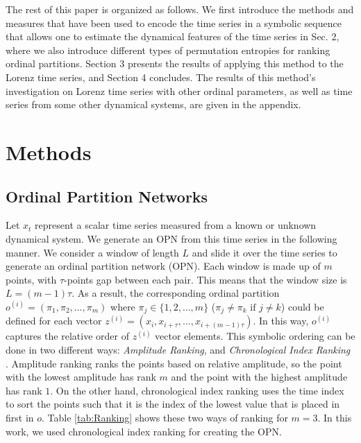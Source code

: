 \documentclass[%
 aip,
 amsmath,amssymb,
 reprint,%
]{revtex4-1}
\begin{document}
The rest of this paper is organized as follows. We first introduce the methods and measures that have been used to encode the time series in a symbolic sequence that allows one to estimate the dynamical features of the time series in Sec. 2, where we also introduce different types of permutation entropies for ranking ordinal partitions. Section 3 presents the results of applying this method to the Lorenz time series, and Section 4 concludes. The results of this method's investigation on Lorenz time series with other ordinal parameters, as well as time series from some other dynamical systems, are given in the appendix.

\section{\label{sec:Methods}Methods}

\subsection{\label{sec:Ordinal Partition Networks}Ordinal Partition Networks}

Let $x_t$ represent a scalar time series measured from a known or unknown dynamical system. We generate an OPN from this time series in the following manner. We consider a window of length $L$ and slide it over the time series to generate an ordinal partition network (OPN). Each window is made up of $m$ points, with $\tau$-points gap between each pair. This means that the window size is $L = (m-1)\tau$. As a result, the corresponding ordinal partition $o^{(i)} = (\pi_1, \pi_2,..., \pi_m)$ where $\pi_j \in \{1, 2,...,m\}$ ($\pi_j \neq \pi_k \text{ if } j \neq k$) could be defined for each vector $z^{(i)} = (x_i, x_{i+\tau},..., x_{i+(m-1)\tau})$. 
In this way, $o^{(i)}$ captures the relative order of $z^{(i)}$ vector elements. 
This symbolic ordering can be done in two different ways: \textit{Amplitude Ranking}, and \textit{Chronological Index Ranking} \cite{r23}. Amplitude ranking ranks the points based on relative amplitude, so the point with the lowest amplitude has rank $m$ and the point with the highest amplitude has rank $1$. 
On the other hand, chronological index ranking uses the time index to sort the points such that it is the index of the lowest value that is placed in first in $o$. %
Table \ref{tab:Ranking} shows these two ways of ranking for $m=3$. In this work, we used chronological index ranking for creating the OPN.
\end{document}
